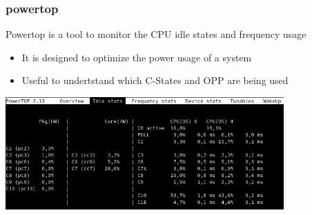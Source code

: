 \begin{frame}
	\frametitle{powertop}
	Powertop is a tool to monitor the CPU idle states and frequency usage
	\begin{itemize}
		\item It is designed to optimize the power usage of a system
		\item Useful to undertstand which C-States and OPP are being used
	\end{itemize}
	\includegraphics[width=0.8\textwidth]{slides/realtime-linux-hardware/powertop.png}
\end{frame}


